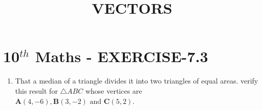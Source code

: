 \documentclass[12pt]{article}
\let\vec\mathbf
\begin{document}
\begin{center}
\title{\textbf{VECTORS}}
\date{\vspace{-5ex}} %
\maketitle
\end{center}

\section{10$^{th}$ Maths - EXERCISE-7.3}

\begin{enumerate}
\item That a median of a triangle divides it into two triangles  of equal areas. verify this result for $\triangle ABC$ whose vertices are $\vec{A}(4,-6),\vec{B}(3,-2)\text{ and }\vec{C}(5,2)$.
\end{enumerate}
\end{document}
